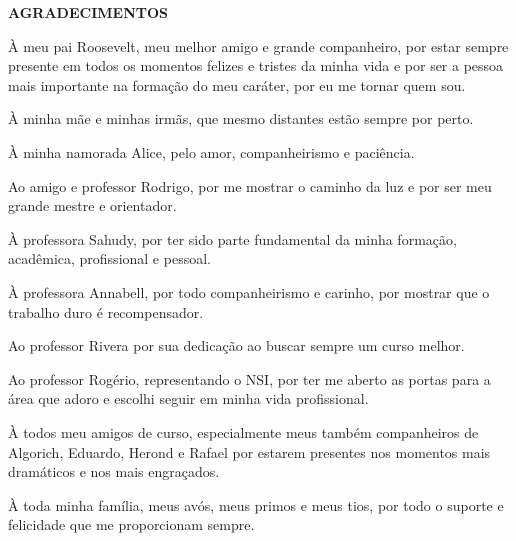 \begin{center}
\textbf{AGRADECIMENTOS} \\ [2.5cm]
\end{center}

À meu pai Roosevelt, meu melhor amigo e grande companheiro, por estar sempre presente em todos os momentos felizes e tristes da minha vida e por ser a pessoa mais importante na formação do meu caráter, por eu me tornar quem sou.

À minha mãe e minhas irmãs, que mesmo distantes estão sempre por perto.

À minha namorada Alice, pelo amor, companheirismo e paciência.

Ao amigo e professor Rodrigo, por me mostrar o caminho da luz e por ser meu grande mestre e orientador.

À professora Sahudy, por ter sido parte fundamental da minha formação, acadêmica, profissional e pessoal.

À professora Annabell, por todo companheirismo e carinho, por mostrar que o trabalho duro é recompensador.

Ao professor Rivera por sua dedicação ao buscar sempre um curso melhor.

Ao professor Rogério, representando o NSI, por ter me aberto as portas para a área que adoro e escolhi seguir em minha vida profissional.

À todos meu amigos de curso, especialmente meus também companheiros de Algorich, Eduardo, Herond e Rafael por estarem presentes nos momentos mais dramáticos e nos mais engraçados.

À toda minha família, meus avós, meus primos e meus tios, por todo o suporte e felicidade que me proporcionam sempre.